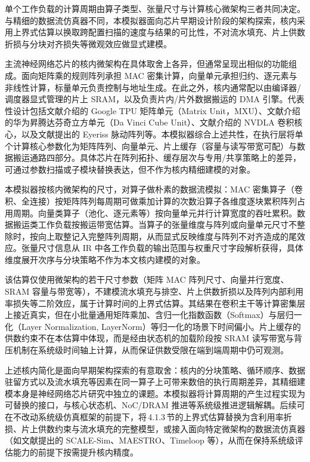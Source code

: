 
单个工作负载的计算周期由算子类型、张量尺寸与计算核心微架构三者共同决定。与精细的数据流仿真器不同，本模拟器面向芯片早期设计阶段的架构探索，核内采用上界式估算以换取跨配置扫描的速度与结果的可比性，不对流水填充、片上供数折损与分块对齐损失等微观效应做显式建模。

主流神经网络芯片的核内微架构在具体取舍上各异，但通常呈现出相似的功能组成。面向矩阵乘的规则阵列承担 MAC 密集计算，向量单元承担归约、逐元素与非线性计算，标量单元负责控制与地址生成。在此之外，核内通常配以由编译器/调度器显式管理的片上 SRAM，以及负责片内/片外数据搬运的 DMA 引擎。代表性设计包括文献\parencite{jouppi2017tpu}介绍的 Google TPU 矩阵单元（Matrix Unit，MXU）、文献\parencite{liao2019davinci,liao2021ascend}介绍的华为昇腾达芬奇立方单元（Da Vinci Cube Unit）、文献\parencite{veronesi2021nvdla}介绍的 NVDLA 卷积核心，以及文献\parencite{chen2016eyeriss}提出的 Eyeriss 脉动阵列等。本模拟器综合上述共性，在执行层将单个计算核心参数化为矩阵阵列、向量单元、片上缓存（容量与读写带宽可配）与数据搬运通路四部分。具体芯片在阵列拓扑、缓存层次与专用/共享策略上的差异，可通过参数扫描或子模块替换表达，但不作为核内精细建模的对象。

本模拟器按核内微架构的尺寸，对算子做朴素的数据流模拟：MAC 密集算子（卷积、全连接）按矩阵阵列每周期可做乘加计算的次数沿算子各维度逐块累积阵列占用周期。向量类算子（池化、逐元素等）按向量单元并行计算宽度的吞吐累积。数据搬运类工作负载按搬运带宽估算。当算子的张量维度与阵列或向量单元尺寸不整除时，按向上取整记入完整阵列周期，从而显式反映维度与阵列不对齐造成的尾效应。张量尺寸信息从 IR 中各工作负载的输出范围与权重尺寸字段解析获得，具体维度展开次序与分块策略不作为本文核内建模的对象。

该估算仅使用微架构的若干尺寸参数（矩阵 MAC 阵列尺寸、向量并行宽度、SRAM 容量与带宽等），不建模流水填充与排空、片上供数折损以及阵列内部利用率损失等二阶效应，属于计算时间的上界式估算。其结果在卷积主干等计算密集层上接近真实，但在小批量通用矩阵乘加、含归一化指数函数（Softmax）与层归一化（Layer Normalization, LayerNorm）等归一化的场景下时间偏小。片上缓存的供数约束不在本估算中体现，而是经由状态机的加载阶段按 SRAM 读写带宽与背压机制在系统级时间轴上计算，从而保证供数受限在端到端周期中仍可观测。

上述核内简化是面向早期架构探索的有意取舍：核内的分块策略、循环顺序、数据驻留方式以及流水填充等因素在同一算子上可带来数倍的执行周期差异，其精细建模本身是神经网络芯片研究中独立的课题\parencite{chen2016eyeriss,kwon2019maestro,parashar2019timeloop}。本模拟器将计算周期的产生过程实现为可替换的接口，与核心状态机、NoC/DRAM 推进等系统级推进逻辑解耦。后续可在不改动系统级仿真框架的前提下，将\,4.1.3\,节的上界式估算替换为含利用率折损、片上供数约束与流水填充的完整模型，或接入面向特定微架构的数据流仿真器（如文献\parencite{samajdar2020scalesim,kwon2019maestro,parashar2019timeloop}提出的 SCALE-Sim、MAESTRO、Timeloop 等），从而在保持系统级评估能力的前提下按需提升核内精度。

